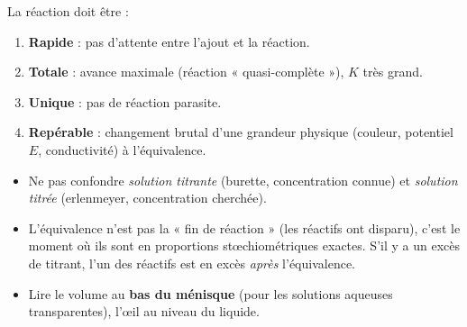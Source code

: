 \documentclass[11pt]{article}
\begin{document}
\begin{aretenir}
La réaction doit être :
\begin{enumerate}
\item \textbf{Rapide} : pas d'attente entre l'ajout et la réaction.
\item \textbf{Totale} : avance maximale (réaction « quasi-complète »), $K$ très grand.
\item \textbf{Unique} : pas de réaction parasite.
\item \textbf{Repérable} : changement brutal d'une grandeur physique (couleur, potentiel $E$, conductivité) à l'équivalence.
\end{enumerate}
\end{aretenir}

\begin{attention}
\begin{itemize}
\item Ne pas confondre \emph{solution titrante} (burette, concentration connue) et \emph{solution titrée} (erlenmeyer, concentration cherchée).
\item L'équivalence n'est pas la « fin de réaction » (les réactifs ont disparu), c'est le moment où ils sont en proportions stœchiométriques exactes. S'il y a un excès de titrant, l'un des réactifs est en excès \emph{après} l'équivalence.
\item Lire le volume au \textbf{bas du ménisque} (pour les solutions aqueuses transparentes), l'œil au niveau du liquide.
\end{itemize}
\end{attention}
\end{document}
